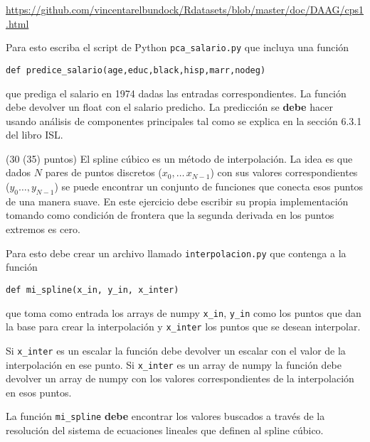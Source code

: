 \documentclass[11pt,letterpaper]{exam}
\begin{document}
\begin{questions}
\url{https://github.com/vincentarelbundock/Rdatasets/blob/master/doc/DAAG/cps1.html}

    Para esto escriba el script de Python \verb"pca_salario.py" que
    incluya una funci\'on

    \verb"def predice_salario(age,educ,black,hisp,marr,nodeg)" 

    que
    prediga el salario en 1974 dadas las entradas correspondientes. 
    La funci\'on debe devolver un float con el salario predicho.
    La predicci\'on se {\bf debe} hacer usando an\'alisis de componentes
    principales tal como se explica en la secci\'on 6.3.1 del libro ISL.


(30 (35) puntos) El spline c\'ubico es un m\'etodo de interpolaci\'on. La idea es que dados
$N$ pares de puntos discretos ($x_0,\ldots\, x_{N-1}$) con sus valores
correspondientes ($y_0\ldots, y_{N-1}$) se puede encontrar un conjunto
de funciones que conecta esos puntos de una manera suave.
En este ejercicio debe escribir su propia implementaci\'on tomando
como condici\'on de frontera que la segunda derivada en los puntos
extremos es cero.

Para esto debe crear un archivo llamado \verb"interpolacion.py" que
contenga a la funci\'on 

\verb"def mi_spline(x_in, y_in, x_inter)" 

que
toma como entrada los arrays de numpy \verb"x_in", \verb"y_in" como los
puntos que dan la base para crear la interpolaci\'on y \verb"x_inter"
los puntos que se desean interpolar. 

Si \verb"x_inter" es un escalar
la funci\'on debe devolver un escalar con el valor de la
interpolaci\'on en ese punto.
Si \verb"x_inter" es un array de numpy la funci\'on debe devolver un
array de numpy con los valores correspondientes de la interpolaci\'on
en esos puntos.

La funci\'on \verb"mi_spline" {\bf debe} encontrar los valores buscados
a trav\'es de la resoluci\'on del sistema de ecuaciones lineales que
definen al spline c\'ubico.

\end{questions}
\end{document}
